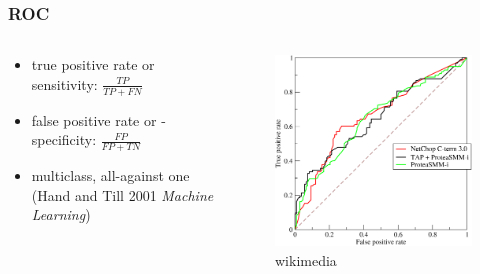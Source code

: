 \documentclass{beamer}\usepackage{graphicx, color}
\begin{document}
\begin{frame}
  \frametitle{ROC}
  \begin{columns}
    \begin{column}{0.4\textwidth}
      \begin{itemize}
        \item true positive rate or sensitivity: \(\frac{TP}{TP + FN}\)
        \item false positive rate or  - specificity: \(\frac{FP}{FP + TN}\)
        \item multiclass, all-against one (Hand and Till 2001 \textit{Machine Learning})
      \end{itemize}
    \end{column}
    \begin{column}{0.6\textwidth}
      \begin{figure}[h]
        \centering
        \captionsetup{justification = raggedleft, slc = off}
        \includegraphics[width = \textwidth, keepaspectratio = true]{figure/wiki_roc}
        \caption*{\scriptsize{wikimedia}}
        \label{fig:roc}
      \end{figure}
    \end{column}
  \end{columns}

\end{frame}
\end{document}
